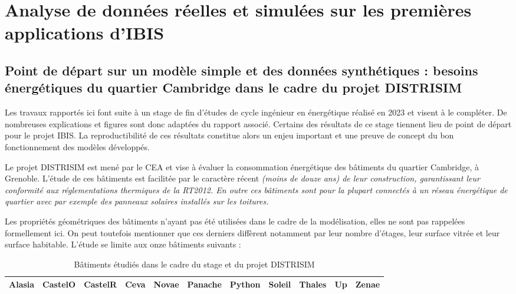 \chapter{Analyse de données réelles et simulées sur les premières applications d'IBIS}\label{ch:analyse-de-donnees-sur-les-premieres-applications-d'ibis}
    \section{Point de départ sur un modèle simple et des données synthétiques : besoins énergétiques du quartier Cambridge dans le cadre du projet DISTRISIM}\label{sec:point-de-depart-sur-un-modele-simple-et-des-donnees-synthetiques-:-besoins-energetiques-du-quartier-cambridge-dans-le-cadre-du-projet-distrisim}
        \begin{bluebox}
            Les travaux rapportés ici font suite à un stage de fin d'études de cycle ingénieur en énergétique
            réalisé en 2023 et visent à le compléter.
            De nombreuses explications et figures sont donc adaptées du rapport associé\cite{TST}.
            Certains des résultats de ce stage tiennent lieu de point de départ pour le projet \gls{IBIS}.
            La reproductibilité de ces résultats constitue alors un enjeu important et une preuve de concept du bon fonctionnement des modèles développés.
        \end{bluebox}

        Le projet DISTRISIM est mené par le \gls{CEA} et vise à évaluer la consommation énergétique des bâtiments du quartier Cambridge, à Grenoble.
        L'étude de ces bâtiments est facilitée par le caractère récent
        \it{(moins de douze ans)} de leur construction, garantissant leur conformité aux
        réglementations thermiques de la RT2012\cite{RT2012, TST}.
        En outre ces bâtiments sont pour la plupart connectés à un réseau énergétique de quartier avec par exemple des panneaux solaires installés sur les toitures\cite{TST}.

        Les propriétés géométriques des bâtiments n'ayant pas été utilisées dans le cadre de la modélisation, elles ne sont pas rappelées formellement ici.
        On peut toutefois mentionner que ces derniers diffèrent notamment par leur nombre d'étages, leur surface vitrée et leur surface habitable.
        L'étude se limite aux onze bâtiments suivants :

        \begin{table}[H]
            \caption{Bâtiments étudiés dans le cadre du stage \cite{TST} et du projet DISTRISIM}
            \centering
            \begin{tabular}{lcccccccccc}
                \toprule
                Alasia &
                CastelO &
                CastelR &
                Ceva &
                Novae &
                Panache &
                Python &
                Soleil &
                Thales &
                Up &
                Zenae \\
                \bottomrule
            \end{tabular}
            \label{tab:building_list}
        \end{table}

